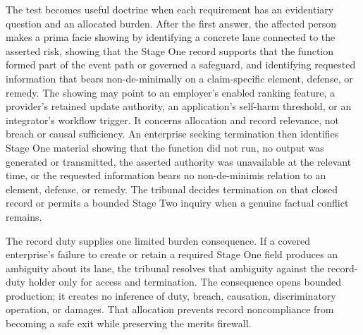 The test becomes useful doctrine when each requirement has an evidentiary question and an allocated burden. After the first answer, the affected person makes a prima facie showing by identifying a concrete lane connected to the asserted risk, showing that the Stage One record supports that the function formed part of the event path or governed a safeguard, and identifying requested information that bears non-de-minimally on a claim-specific element, defense, or remedy. The showing may point to an employer's enabled ranking feature, a provider's retained update authority, an application's self-harm threshold, or an integrator's workflow trigger. It concerns allocation and record relevance, not breach or causal sufficiency. An enterprise seeking termination then identifies Stage One material showing that the function did not run, no output was generated or transmitted, the asserted authority was unavailable at the relevant time, or the requested information bears no non-de-minimis relation to an element, defense, or remedy. The tribunal decides termination on that closed record or permits a bounded Stage Two inquiry when a genuine factual conflict remains.

The record duty supplies one limited burden consequence. If a covered enterprise's failure to create or retain a required Stage One field produces an ambiguity about its lane, the tribunal resolves that ambiguity against the record-duty holder only for access and termination. The consequence opens bounded production; it creates no inference of duty, breach, causation, discriminatory operation, or damages. That allocation prevents record noncompliance from becoming a safe exit while preserving the merits firewall.

